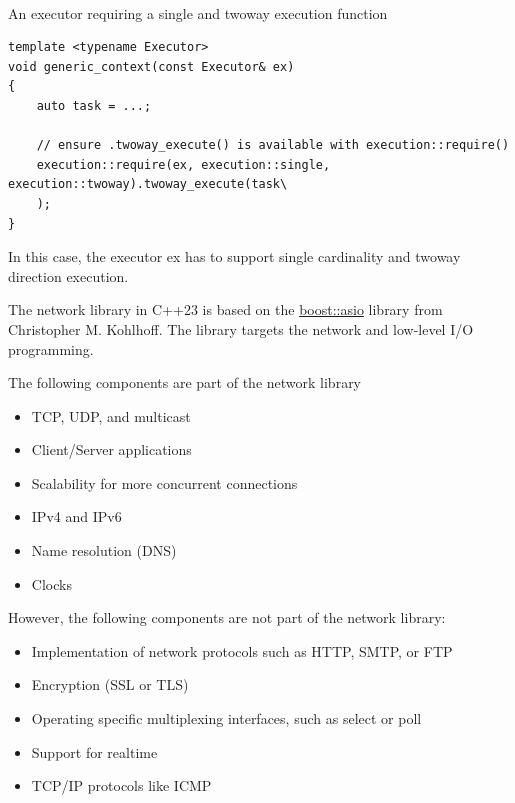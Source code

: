 \hspace*{\fill} \\ %
\noindent
An executor requiring a single and twoway execution function
\begin{lstlisting}[style=styleCXX]
template <typename Executor>
void generic_context(const Executor& ex)
{
	auto task = ...;
	
	// ensure .twoway_execute() is available with execution::require()
	execution::require(ex, execution::single, execution::twoway).twoway_execute(task\
	);
}
\end{lstlisting}

In this case, the executor ex has to support single cardinality and twoway direction execution.


The network library in C++23 is based on the \href{https://www.boost.org/doc/libs/1_75_0/doc/html/boost_asio.html}{boost::asio} library from Christopher M. Kohlhoff. The library targets the network and low-level I/O programming.

The following components are part of the network library

\begin{itemize}
\item 
TCP, UDP, and multicast

\item 
Client/Server applications

\item 
Scalability for more concurrent connections

\item 
IPv4 and IPv6

\item 
Name resolution (DNS)

\item 
Clocks
\end{itemize}

However, the following components are not part of the network library:

\begin{itemize}
\item 
Implementation of network protocols such as HTTP, SMTP, or FTP

\item 
Encryption (SSL or TLS)

\item 
Operating specific multiplexing interfaces, such as select or poll

\item 
Support for realtime

\item 
TCP/IP protocols like ICMP
\end{itemize}

